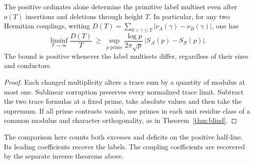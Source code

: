 \begin{corollary}\label{cor:sublinear}
The positive ordinates alone determine the primitive label multiset even after $o(T)$ insertions and deletions through height $T$. In particular, for any two Hermitian couplings, writing $D(T)=\sum_{0<\gamma\le T}|\nu_A(\gamma)-\nu_B(\gamma)|$, one has
\[
 \liminf_{T\to\infty}\frac{D(T)}{T}\ \ge\
 \sup_{p\text{ prime}}\frac{\log p}{2\pi\sqrt p}\,
       |S_{\mathcal A}(p)-S_{\mathcal B}(p)|.
\]
The bound is positive whenever the label multisets differ, regardless of their sizes and conductors.
\end{corollary}
\begin{proof}
Each changed multiplicity alters a trace sum by a quantity of modulus at most one. Sublinear corruption preserves every normalized trace limit. Subtract the two trace formulas at a fixed prime, take absolute values and then take the supremum. If all prime contrasts vanish, use primes in each unit residue class of a common modulus and character orthogonality, as in Theorem~\ref{thm:blind}.
\end{proof}
The comparison here counts both excesses and deficits on the positive half-line. Its leading coefficients recover the labels. The coupling coefficients are recovered by the separate inverse theorems above.
